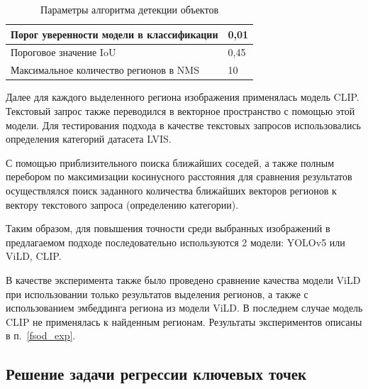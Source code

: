 \documentclass[a4paper,14pt]{article}
\begin{document}
    \begin{center}
        \begin{table}[H]
            \centering
            \caption{Параметры алгоритма детекции объектов}
            \label{tab:base_params}
            \bgroup
            \def\arraystretch{1.5}
            \begin{tabular}{| l | l |}
                \hline
                Порог уверенности модели в классификации & 0,01 \\ \hline
                Пороговое значение IoU                   & 0,45 \\ \hline
                Максимальное количество регионов в NMS   & 10   \\
                \hline
            \end{tabular}
            \egroup
        \end{table}
    \end{center}

    Далее для каждого выделенного региона изображения применялась модель CLIP.
    Текстовый запрос также переводился в векторное пространство с помощью этой модели.
    Для тестирования подхода в качестве текстовых запросов использовались определения категорий датасета LVIS.

    С помощью приблизительного поиска ближайших соседей, а также полным перебором по максимизации косинусного расстояния для сравнения результатов осуществлялся поиск заданного количества ближайших векторов регионов к вектору текстового запроса (определению категории).

    Таким образом, для повышения точности среди выбранных изображений в предлагаемом подходе последовательно используются 2 модели: YOLOv5 или ViLD, CLIP.

    В качестве эксперимента также было проведено сравнение качества модели ViLD при использовании только результатов выделения регионов, а также с использованием эмбеддинга региона из модели ViLD.
    В последнем случае модель CLIP не применялась к найденным регионам.
    Результаты экспериментов описаны в п.~\ref{fsod_exp}.

    \subsection{Решение задачи регрессии ключевых точек}
\end{document}
